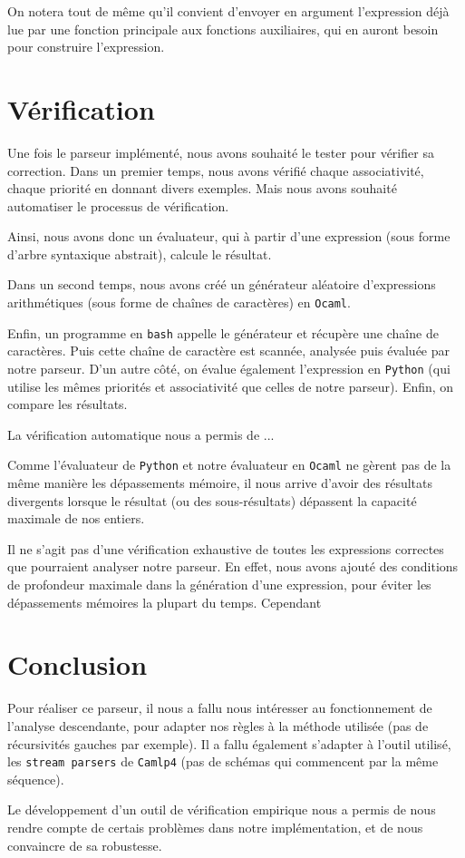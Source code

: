 \documentclass[11pt]{article}
\begin{document}
On notera tout de même qu'il convient d'envoyer en argument l'expression déjà lue par une fonction principale aux fonctions auxiliaires, qui en auront besoin pour construire l'expression. 

\section{Vérification}
Une fois le parseur implémenté, nous avons souhaité le tester pour vérifier sa correction.
Dans un premier temps, nous avons vérifié chaque associativité, chaque priorité en donnant divers exemples. Mais nous avons souhaité automatiser le processus de vérification.


Ainsi, nous avons donc un évaluateur, qui à partir d'une expression (sous forme d'arbre syntaxique abstrait), calcule le résultat.

Dans un second temps, nous avons créé un générateur aléatoire d'expressions arithmétiques (sous forme de chaînes de caractères) en \texttt{Ocaml}.

Enfin, un programme en \texttt{bash} appelle le générateur et récupère une chaîne de caractères. Puis cette chaîne de caractère est scannée, analysée puis évaluée par notre parseur. D'un autre côté, on évalue également l'expression en \texttt{Python} (qui utilise les mêmes priorités et associativité que celles de notre parseur). Enfin, on compare les résultats.


La vérification automatique nous a permis de ... %

Comme l'évaluateur de \texttt{Python} et notre évaluateur en \texttt{Ocaml} ne gèrent pas de la même manière les dépassements mémoire, il nous arrive d'avoir des résultats divergents lorsque le résultat (ou des sous-résultats) dépassent la capacité maximale de nos entiers. 




Il ne s'agit pas d'une vérification exhaustive de toutes les expressions correctes que pourraient analyser notre parseur. En effet, nous avons ajouté des conditions de profondeur maximale dans la génération d'une expression, pour éviter les dépassements mémoires la plupart du temps. Cependant

\section{Conclusion}
Pour réaliser ce parseur, il nous a fallu nous intéresser au fonctionnement de l'analyse descendante, pour adapter nos règles à la méthode utilisée (pas de récursivités gauches par exemple). Il a fallu également s'adapter à l'outil utilisé, les \texttt{stream parsers} de \texttt{Camlp4} (pas de schémas qui commencent par la même séquence).

Le développement d'un outil de vérification empirique nous a permis de nous rendre compte de certais problèmes dans notre implémentation, et de nous convaincre de sa robustesse.
\end{document}
